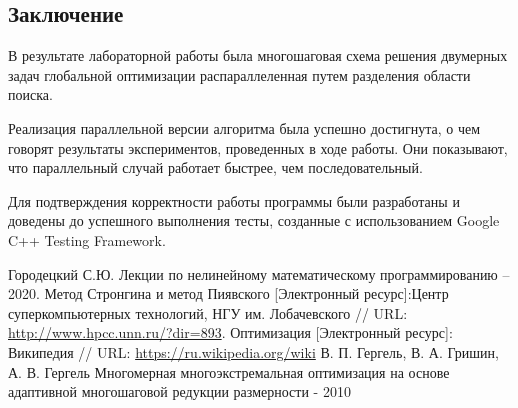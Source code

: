 \documentclass[a4paper]{report}
\begin{document}
\begin{center}
\section*{Заключение}
\end{center}
\par В результате лабораторной работы была многошаговая схема решения двумерных задач глобальной оптимизации распараллеленная путем разделения области поиска.
\par Реализация параллельной версии алгоритма была успешно достигнута, о чем говорят результаты экспериментов, проведенных в ходе работы. Они показывают, что параллельный случай работает быстрее, чем последовательный. 
\par Для подтверждения корректности работы программы были разработаны и доведены до успешного выполнения тесты, созданные с использованием Google C++ Testing Framework. 
\newpage

\begin{thebibliography}{}
 Городецкий С.Ю. Лекции по нелинейному математическому программированию – 2020.
 Метод Стронгина и метод Пиявского [Электронный ресурс]:Центр суперкомпьютерных технологий, НГУ им. Лобачевского // URL: \url{http://www.hpcc.unn.ru/?dir=893}.
 Оптимизация [Электронный ресурс]: Википедия // URL: \url{https://ru.wikipedia.org/wiki} 
  В. П. Гергель, В. А. Гришин, А. В. Гергель Многомерная многоэкстремальная оптимизация на основе адаптивной многошаговой редукции размерности - 2010
\end{thebibliography}{}
\newpage
\end{document}
